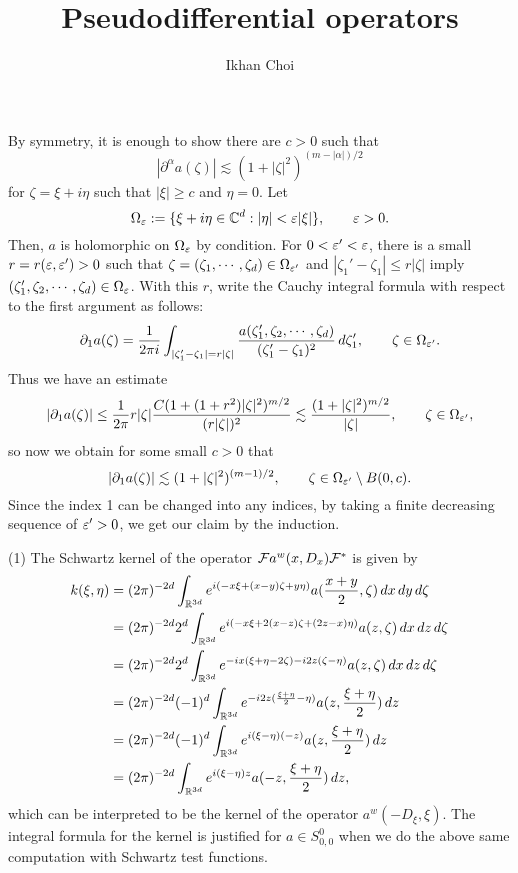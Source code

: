 \documentclass{../../../small}
\begin{document}
\title{Pseudodifferential operators}
\author{Ikhan Choi}
\date{}
\maketitle

\renewcommand{\theprb}{\arabic{prb}}

\begin{pf}[Solution of 1]
By symmetry, it is enough to show there are $c>0$ such that
\[|\partial^\alpha a(\zeta)|\lesssim(1+|\zeta|^2)^{(m-|\alpha|)/2}\]
for $\zeta=\xi+i\eta$ such that $|\xi|\ge c$ and $\eta=0$.
Let
\[\Omega_\varepsilon:=\{\xi+i\eta\in\mathbb{C}^d:|\eta|<\varepsilon|\xi|\},\qquad\varepsilon>0.\]
Then, $a$ is holomorphic on $\Omega_\varepsilon$ by condition.
For $0<\varepsilon'<\varepsilon$, there is a small $r=r(\varepsilon,\varepsilon')>0$ such that $\zeta=(\zeta_1,\cdots,\zeta_d)\in\Omega_{\varepsilon'}$ and $|\zeta_1'-\zeta_1|\le r|\zeta|$ imply $(\zeta_1',\zeta_2,\cdots,\zeta_d)\in\Omega_\varepsilon$.
With this $r$, write the Cauchy integral formula with respect to the first argument as follows:
\[\partial_1a(\zeta)=\frac1{2\pi i}\int_{|\zeta_1'-\zeta_1|=r|\zeta|}\frac{a(\zeta_1',\zeta_2,\cdots,\zeta_d)}{(\zeta'_1-\zeta_1)^2}\,d\zeta'_1,\qquad\zeta\in\Omega_{\varepsilon'}.\]
Thus we have an estimate
\[|\partial_1a(\zeta)|\le \frac1{2\pi}r|\zeta|\frac{C(1+(1+r^2)|\zeta|^2)^{m/2}}{(r|\zeta|)^2}\lesssim\frac{(1+|\zeta|^2)^{m/2}}{|\zeta|},\qquad\zeta\in\Omega_{\varepsilon'},\]
so now we obtain for some small $c>0$ that
\[|\partial_1a(\zeta)|\lesssim(1+|\zeta|^2)^{(m-1)/2},\qquad\zeta\in\Omega_{\varepsilon'}\setminus B(0,c).\]
Since the index 1 can be changed into any indices, by taking a finite decreasing sequence of $\varepsilon'>0$, we get our claim by the induction.
\end{pf}

\begin{pf}[Solution of 2]
(1)
The Schwartz kernel of the operator $\mathcal{F} a^w(x,D_x)\mathcal{F}^*$ is given by
\begin{align*}
k(\xi,\eta)
&=(2\pi)^{-2d}\int_{\mathbb{R}^{3d}}e^{i(-x\xi+(x-y)\zeta+y\eta)}a(\frac{x+y}2,\zeta)\,dx\,dy\,d\zeta\\
&=(2\pi)^{-2d}2^d\int_{\mathbb{R}^{3d}}e^{i(-x\xi+2(x-z)\zeta+(2z-x)\eta)}a(z,\zeta)\,dx\,dz\,d\zeta\\
&=(2\pi)^{-2d}2^d\int_{\mathbb{R}^{3d}}e^{-ix(\xi+\eta-2\zeta)-i2z(\zeta-\eta)}a(z,\zeta)\,dx\,dz\,d\zeta\\
&=(2\pi)^{-2d}(-1)^d\int_{\mathbb{R}^{3d}}e^{-i2z(\frac{\xi+\eta}2-\eta)}a(z,\frac{\xi+\eta}2)\,dz\\
&=(2\pi)^{-2d}(-1)^d\int_{\mathbb{R}^{3d}}e^{i(\xi-\eta)(-z)}a(z,\frac{\xi+\eta}2)\,dz\\
&=(2\pi)^{-2d}\int_{\mathbb{R}^{3d}}e^{i(\xi-\eta)z}a(-z,\frac{\xi+\eta}2)\,dz,
\end{align*}
which can be interpreted to be the kernel of the operator $a^w(-D_\xi,\xi)$.
The integral formula for the kernel is justified for $a\in S^0_{0,0}$ when we do the above same computation with Schwartz test functions.
\end{pf}
\end{document}
